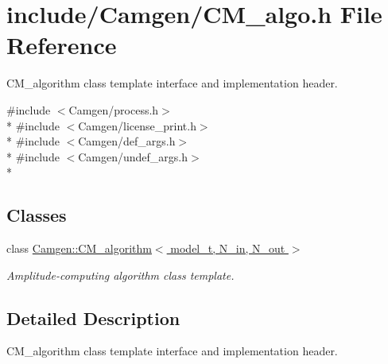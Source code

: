 \hypertarget{a00610}{}\section{include/\+Camgen/\+C\+M\+\_\+algo.h File Reference}
\label{a00610}


C\+M\+\_\+algorithm class template interface and implementation header.  


{\ttfamily \#include $<$Camgen/process.\+h$>$}\\*
{\ttfamily \#include $<$Camgen/license\+\_\+print.\+h$>$}\\*
{\ttfamily \#include $<$Camgen/def\+\_\+args.\+h$>$}\\*
{\ttfamily \#include $<$Camgen/undef\+\_\+args.\+h$>$}\\*
\subsection*{Classes}
\begin{DoxyCompactItemize}
\item 
class \hyperlink{a00065}{Camgen\+::\+C\+M\+\_\+algorithm$<$ model\+\_\+t, N\+\_\+in, N\+\_\+out $>$}
\begin{DoxyCompactList}\small\item\em Amplitude-\/computing algorithm class template. \end{DoxyCompactList}\end{DoxyCompactItemize}


\subsection{Detailed Description}
C\+M\+\_\+algorithm class template interface and implementation header. 

